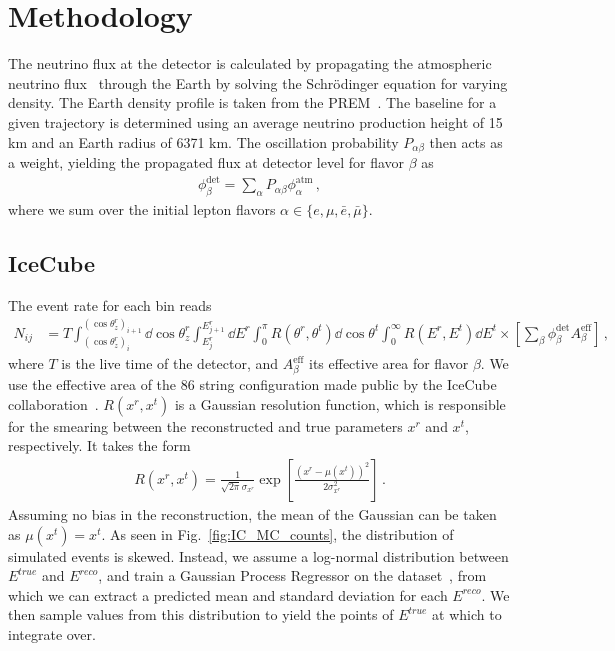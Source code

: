 \documentclass[draft=True]{revtex4-2}
\begin{document}
\section{Methodology}
The neutrino flux at the detector is calculated by propagating the atmospheric neutrino flux~\cite{hondapaper} through the Earth by solving the 
Schrödinger equation for varying density. The Earth density profile is taken from the PREM~\cite{PREM}. The baseline for a given trajectory is determined using an average neutrino
production height of 15 km and an Earth radius of 6371 km. 
The oscillation probability $P_{\alpha \beta}$ then acts as a weight, yielding the propagated flux at detector level for flavor $\beta$ as 
\begin{align}\label{eq:propFlux}
    \phi_\beta^\text{det} = \sum_\alpha P_{\alpha\beta} \phi_\alpha^\text{atm} \,,
\end{align}
where we sum over the initial lepton flavors $\alpha \in \{e,\mu, \bar{e}, \bar{\mu}\}$.
\subsection{IceCube}\label{ch:ICmethod}
The event rate for each bin reads
\begin{align}\label{eq:ICevents}
    N_{ij} &= T \int_{(\cos{\theta_z^r})_i}^{(\cos{\theta_z^r})_{i+1}} \dd \cos{\theta^r_z} \int_{E^r_{j}}^{E^r_{j+1}} \dd E^r \int_0^\pi R(\theta^r,\theta^t) \dd \cos{\theta^t} \int_0^\infty R(E^r,E^t) \dd E^t
    \times \left[ \sum_\beta \phi_\beta^\text{det}  A^\text{eff}_\beta\right]\,,
\end{align}
where $T$ is the live time of the detector, and $A^\text{eff}_\beta$ its effective area for flavor $\beta$. We use the effective area of the 86 string configuration made public by the IceCube collaboration~\cite{ICaeff}. $R(x^r,x^t)$ is a Gaussian resolution function, 
which is responsible for the smearing between the reconstructed and true parameters $x^r$ and $x^t$, respectively. It takes the form 
\begin{align}
    R(x^r, x^t) = \frac{1}{\sqrt{2\pi} \sigma_{x^r}} \exp\left[\frac{(x^r-\mu(x^t))^2}{2\sigma_{x^r}^2}\right]\,.
\end{align}
Assuming no bias in the reconstruction, the mean of the Gaussian can be taken as $\mu(x^t) = x^t$. As seen in Fig.~\ref{fig:IC_MC_counts}, the distribution of 
simulated events is skewed. Instead, we assume a log-normal distribution between $E^{true}$ and $E^{reco}$, and train a Gaussian Process Regressor on the dataset~\cite{IC2016}, from which
we can extract a predicted mean and standard deviation for each $E^{reco}$. We then sample values from this distribution to yield 
the points of $E^{true}$ at which to integrate over. 
\end{document}
